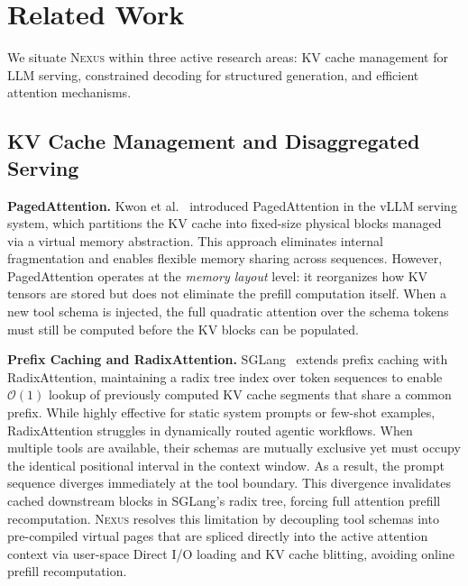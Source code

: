 \documentclass[conference,10pt]{IEEEtran}
\newcommand{\Nexus}{\textsc{Nexus}\xspace}
\begin{document}
\section{Related Work}
\label{sec:related-work}

We situate \Nexus within three active research areas: KV cache management for
LLM serving, constrained decoding for structured generation, and efficient
attention mechanisms.

\subsection{KV Cache Management and Disaggregated Serving}
\label{subsec:rw-kvcache}

\textbf{PagedAttention.} Kwon et al.~\cite{kwon2023vllm} introduced
PagedAttention in the vLLM serving system, which partitions the KV cache into
fixed-size physical blocks managed via a virtual memory abstraction. This approach
eliminates internal fragmentation and enables flexible memory sharing across
sequences. However, PagedAttention operates at the \emph{memory layout} level:
it reorganizes how KV tensors are stored but does not eliminate the prefill
computation itself. When a new tool schema is injected, the full quadratic
attention over the schema tokens must still be computed before the KV blocks
can be populated.

\textbf{Prefix Caching and RadixAttention.} SGLang~\cite{zheng2024sglang}
extends prefix caching with RadixAttention, maintaining a radix tree index over token sequences to enable
$\mathcal{O}(1)$ lookup of previously computed KV cache segments that share a common
prefix. While highly effective for static system prompts or few-shot examples, RadixAttention struggles in dynamically routed agentic workflows. When multiple tools are available, their schemas are mutually exclusive yet must occupy the identical positional interval in the context window. As a result, the prompt sequence diverges immediately at the tool boundary. This divergence invalidates cached downstream blocks in SGLang's radix tree, forcing full attention prefill recomputation. \Nexus resolves this limitation by decoupling tool schemas into pre-compiled virtual pages that are spliced directly into the active attention context via user-space Direct I/O loading and KV cache blitting, avoiding online prefill recomputation.
\end{document}
